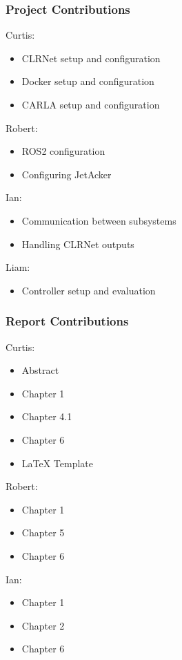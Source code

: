 \documentclass[titlepage]{article}
\begin{document}
\subsubsection{Project Contributions}

Curtis: 
\begin{itemize}
	\item CLRNet setup and configuration
	\item Docker setup and configuration
	\item CARLA setup and configuration
\end{itemize}

Robert: 
\begin{itemize}
	\item ROS2 configuration
	\item Configuring JetAcker
\end{itemize}

Ian:
\begin{itemize}
	\item Communication between subsystems
	\item Handling CLRNet outputs
\end{itemize}

Liam: 
\begin{itemize}
\item Controller setup and evaluation
\end{itemize}


\subsubsection{Report Contributions}
Curtis: 
\begin{itemize}
	\item Abstract
	\item Chapter 1
	\item Chapter 4.1
	\item Chapter 6
	\item LaTeX Template
\end{itemize}

Robert: 
\begin{itemize}
	\item Chapter 1
	\item Chapter 5
	\item Chapter 6
\end{itemize}

Ian:
\begin{itemize}
	\item Chapter 1
	\item Chapter 2
	\item Chapter 6
\end{itemize}
\end{document}
